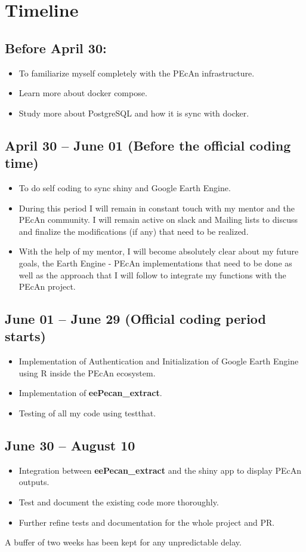 \documentclass{eepecan}
\begin{document}
	\section{Timeline}
	
	\subsection*{Before April 30:}
	
	\begin{itemize}
		\item To familiarize myself completely with the PEcAn infrastructure.
		\item Learn more about docker compose.
		\item Study more about PostgreSQL and how it is sync with docker.
	\end{itemize}
	
	\subsection*{April 30 – June 01 (Before the official coding time)}
	\begin{itemize}
		\item To do self coding to sync shiny and Google Earth Engine.
		\item During this period I will remain in constant touch with my mentor and the PEcAn community. I will remain active on slack and Mailing lists to discuss and finalize the modifications (if any) that need to be realized.
		\item With the help of my mentor, I will become absolutely clear about my future goals, the Earth Engine - PEcAn implementations that need to be done as well as the approach that I will follow to integrate my functions with the PEcAn project.
	\end{itemize}
	\subsection*{June 01 – June 29 (Official coding period starts)}
	\begin{itemize}
		\item Implementation of Authentication and Initialization of Google Earth Engine using R inside the PEcAn ecosystem.
		\item Implementation of \textbf{eePecan\_extract}.
		\item Testing of all my code using testthat.
	\end{itemize}			
	\subsection*{June 30 – August 10}
	\begin{itemize}
		\item Integration between \textbf{eePecan\_extract} and the shiny app to display PEcAn outputs.
		\item Test and document the existing code more thoroughly.
		\item Further refine tests and documentation for the whole project and PR.
	\end{itemize}			
	A buffer of two weeks has been kept for any unpredictable delay.
\end{document}
